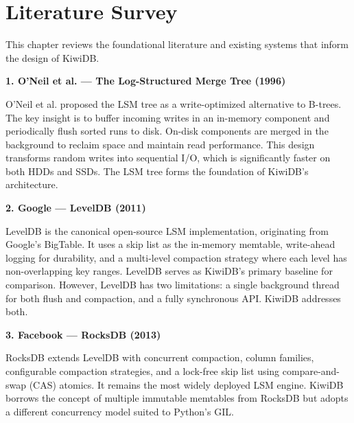 \documentclass[oneside,a4paper,12pt]{book}
\begin{document}
\chapter{Literature Survey}

This chapter reviews the foundational literature and existing systems that inform the design of KiwiDB.

\vspace{1\baselineskip}

\textbf{1. O'Neil et al. --- The Log-Structured Merge Tree (1996) \cite{c5}}

O'Neil et al. proposed the LSM tree as a write-optimized alternative to B-trees. The key insight is to buffer incoming writes in an in-memory component and periodically flush sorted runs to disk. On-disk components are merged in the background to reclaim space and maintain read performance. This design transforms random writes into sequential I/O, which is significantly faster on both HDDs and SSDs. The LSM tree forms the foundation of KiwiDB's architecture.

\vspace{1\baselineskip}

\textbf{2. Google --- LevelDB (2011) \cite{c7}}

LevelDB is the canonical open-source LSM implementation, originating from Google's BigTable. It uses a skip list as the in-memory memtable, write-ahead logging for durability, and a multi-level compaction strategy where each level has non-overlapping key ranges. LevelDB serves as KiwiDB's primary baseline for comparison. However, LevelDB has two limitations: a single background thread for both flush and compaction, and a fully synchronous API. KiwiDB addresses both.

\vspace{1\baselineskip}

\textbf{3. Facebook --- RocksDB (2013) \cite{c8}}

RocksDB extends LevelDB with concurrent compaction, column families, configurable compaction strategies, and a lock-free skip list using compare-and-swap (CAS) atomics. It remains the most widely deployed LSM engine. KiwiDB borrows the concept of multiple immutable memtables from RocksDB but adopts a different concurrency model suited to Python's GIL.

\vspace{1\baselineskip}
\end{document}
